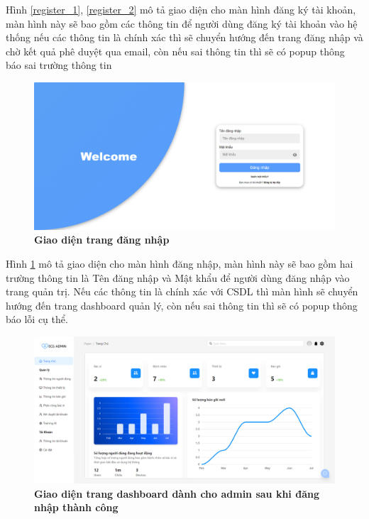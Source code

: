 Hình \ref{register_1}, \ref{register_2} mô tả giao diện cho màn hình đăng ký tài khoản, màn hình này sẽ bao
 gồm các thông tin để người dùng đăng ký tài khoản vào hệ thống
 nếu các thông tin là chính xác thì sẽ chuyển hướng đến trang đăng nhập và chờ kết quả phê duyệt qua email, 
 còn nếu sai thông tin thì sẽ có popup thông báo sai trường thông tin

\begin{figure}[H]
  \centering
  \includegraphics[scale=0.4]{Images/server/webUI/login.png}
  \caption[Giao diện trang đăng nhập]{\bfseries \fontsize{12pt}{0pt}\selectfont Giao diện trang đăng nhập}
  \label{login} %
\end{figure}

Hình \ref{login} mô tả giao diện cho màn hình đăng nhập, màn hình này sẽ bao
 gồm hai trường thông tin là Tên đăng nhập và Mật khẩu để người dùng đăng nhập vào trang quản trị.
 Nếu các thông tin là chính xác với CSDL thì màn hình sẽ chuyển hướng đến trang dashboard 
 quản lý, còn nếu sai thông tin thì sẽ có popup thông báo lỗi cụ thể.

 \begin{figure}[H]
  \centering
  \includegraphics[scale=0.4]{Images/server/webUI/dashboard_admin.png}
  \caption[Giao diện trang dashboard dành cho quản trị viên sau khi đăng nhập thành công]{\bfseries \fontsize{12pt}{0pt}\selectfont Giao diện trang dashboard dành cho admin sau khi đăng nhập thành công}
  \label{dashboard_admin} %
\end{figure}

